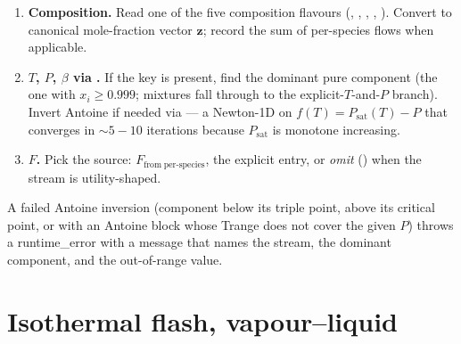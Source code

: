 \documentclass[11pt,a4paper]{article}
\newcommand{\zv}{\mathbf{z}}
\begin{document}
\begin{enumerate}[leftmargin=*,nosep,topsep=2pt]
\item \textbf{Composition.}  Read one of the five composition
      flavours (, ,
      , , ).
      Convert to canonical mole-fraction vector $\zv$; record the
      sum of per-species flows when applicable.
\item \textbf{$T$, $P$, $\beta$ via .}  If the
       key is present, find the dominant pure
      component (the one with $x_i \ge 0.999$; mixtures fall
      through to the explicit-$T$-and-$P$ branch).  Invert
      Antoine if needed via  --- a Newton-1D on
      $f(T) = P_{\mathrm{sat}}(T) - P$ that converges in
      $\sim 5{-}10$ iterations because $P_{\mathrm{sat}}$ is
      monotone increasing.
\item \textbf{$F$.}  Pick the source:
      \(F_{\mathrm{from\;per\text{-}species}}\), the explicit
       entry, or \emph{omit} ()
      when the stream is utility-shaped.
\end{enumerate}

A failed Antoine inversion (component below its triple point,
above its critical point, or with an Antoine block whose Trange
does not cover the given $P$) throws a runtime\_error with a
message that names the stream, the dominant component, and the
out-of-range value.

\section{Isothermal flash, vapour--liquid}\label{ch:flash}
\end{document}
